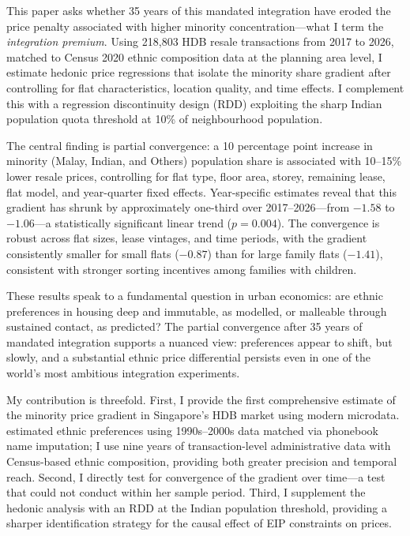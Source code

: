 \documentclass[12pt]{article}
\begin{document}
This paper asks whether 35 years of this mandated integration have eroded the price penalty associated with higher minority concentration---what I term the \textit{integration premium}. Using 218,803 HDB resale transactions from 2017 to 2026, matched to Census 2020 ethnic composition data at the planning area level, I estimate hedonic price regressions that isolate the minority share gradient after controlling for flat characteristics, location quality, and time effects. I complement this with a regression discontinuity design (RDD) exploiting the sharp Indian population quota threshold at 10\% of neighbourhood population.

The central finding is partial convergence: a 10 percentage point increase in minority (Malay, Indian, and Others) population share is associated with 10--15\% lower resale prices, controlling for flat type, floor area, storey, remaining lease, flat model, and year-quarter fixed effects. Year-specific estimates reveal that this gradient has shrunk by approximately one-third over 2017--2026---from $-1.58$ to $-1.06$---a statistically significant linear trend ($p = 0.004$). The convergence is robust across flat sizes, lease vintages, and time periods, with the gradient consistently smaller for small flats ($-0.87$) than for large family flats ($-1.41$), consistent with stronger sorting incentives among families with children.

These results speak to a fundamental question in urban economics: are ethnic preferences in housing deep and immutable, as \citet{schelling1971} modelled, or malleable through sustained contact, as \citet{allport1954} predicted? The partial convergence after 35 years of mandated integration supports a nuanced view: preferences appear to shift, but slowly, and a substantial ethnic price differential persists even in one of the world's most ambitious integration experiments.

My contribution is threefold. First, I provide the first comprehensive estimate of the minority price gradient in Singapore's HDB market using modern microdata. \citet{wong2013} estimated ethnic preferences using 1990s--2000s data matched via phonebook name imputation; I use nine years of transaction-level administrative data with Census-based ethnic composition, providing both greater precision and temporal reach. Second, I directly test for convergence of the gradient over time---a test that \citet{wong2013} could not conduct within her sample period. Third, I supplement the hedonic analysis with an RDD at the Indian population threshold, providing a sharper identification strategy for the causal effect of EIP constraints on prices.
\end{document}
